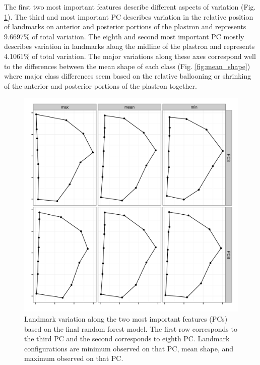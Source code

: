 \documentclass[12pt,letterpaper]{article}\usepackage{graphicx, color}
\begin{document}
The first two most important features describe different aspects of variation (Fig. \ref{fig:imp_var}). The third and most important PC describes variation in the relative position of landmarks on anterior and posterior portions of the plastron and represents 9.6697\% of total variation. The eighth and second most important PC mostly describes variation in landmarks along the midline of the plastron and represents 4.1061\% of total variation. The major variations along these axes correspond well to the differences between the mean shape of each class (Fig. \ref{fig:mean_shape}) where major class differences seem based on the relative ballooning or shrinking of the anterior and posterior portions of the plastron together.

\begin{figure}[ht]
  \centering
  \includegraphics[width = \textwidth]{figure/imp_var}
  \caption{Landmark variation along the two most important features (PCs) based on the final random forest model. The first row corresponds to the third PC and the second corresponds to eighth PC. Landmark configurations are minimum observed on that PC, mean shape, and maximum observed on that PC.}
  \label{fig:imp_var}
\end{figure}
\end{document}
